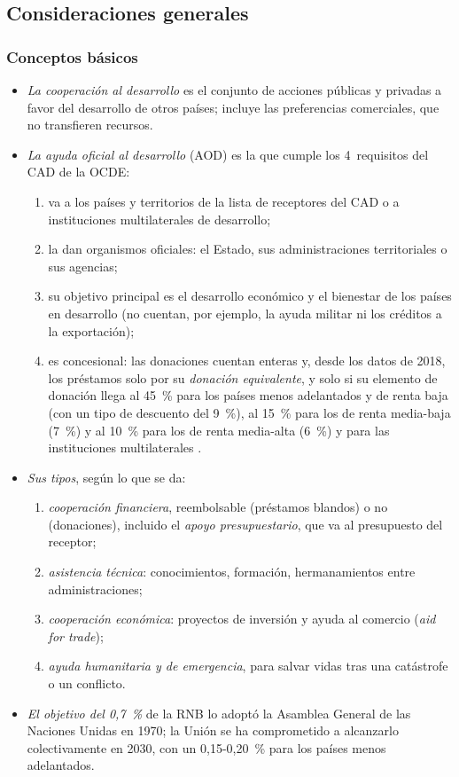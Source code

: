 \documentclass[11pt]{article}
\begin{document}
\subsection{Consideraciones generales}\label{sec:coop-general}

\subsubsection{Conceptos básicos}\label{sec:conceptos}

\begin{itemize}
\item \emph{La cooperación al desarrollo} es el conjunto de acciones públicas y privadas a favor del desarrollo de otros países; incluye las preferencias comerciales, que no transfieren recursos.
\item \emph{La ayuda oficial al desarrollo} (AOD) es la que cumple los 4~requisitos del CAD de la OCDE\nocite{OCDE2026DefinicionAOD}:
  \begin{enumerate}
  \item va a los países y territorios de la lista de receptores del CAD o a instituciones multilaterales de desarrollo;
  \item la dan organismos oficiales: el Estado, sus administraciones territoriales o sus agencias;
  \item su objetivo principal es el desarrollo económico y el bienestar de los países en desarrollo (no cuentan, por ejemplo, la ayuda militar ni los créditos a la exportación);
  \item es concesional: las donaciones cuentan enteras y, desde los datos de 2018, los préstamos solo por su \emph{donación equivalente}, y solo si su elemento de donación llega al 45~\% para los países menos adelantados y de renta baja (con un tipo de descuento del 9~\%), al 15~\% para los de renta media-baja (7~\%) y al 10~\% para los de renta media-alta (6~\%) y para las instituciones multilaterales .
  \end{enumerate}
\item \emph{Sus tipos}, según lo que se da:
  \begin{enumerate}
  \item \emph{cooperación financiera}, reembolsable (préstamos blandos) o no (donaciones), incluido el \emph{apoyo presupuestario}, que va al presupuesto del receptor;
  \item \emph{asistencia técnica}: conocimientos, formación, hermanamientos entre administraciones;
  \item \emph{cooperación económica}: proyectos de inversión y ayuda al comercio (\emph{aid for trade});
  \item \emph{ayuda humanitaria y de emergencia}, para salvar vidas tras una catástrofe o un conflicto.
  \end{enumerate}
\item \emph{El objetivo del 0,7~\%} de la RNB lo adoptó la Asamblea General de las Naciones Unidas en 1970; la Unión se ha comprometido a alcanzarlo colectivamente en 2030, con un 0,15-0,20~\% para los países menos adelantados\nocite{Consejo2015FfD}.
\end{itemize}
\end{document}
